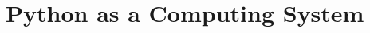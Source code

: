 \documentclass[xcolor=x11names,10pt, aspectratio=169]{beamer}
\newcommand{\opt}[1]{\textcolor{optred}{#1}}
\begin{document}
\section{Python as a Computing System}
%
%
%
%
\end{document}
